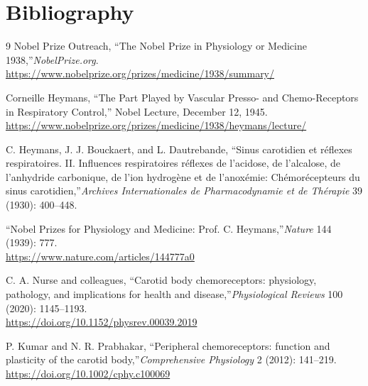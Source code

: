 \section{Bibliography}

\begin{thebibliography}{9}
Nobel Prize Outreach, ``The Nobel Prize in Physiology or Medicine 1938,''\emph{NobelPrize.org}.\\
\url{https://www.nobelprize.org/prizes/medicine/1938/summary/}

Corneille Heymans, ``The Part Played by Vascular Presso- and Chemo-Receptors in Respiratory Control,'' Nobel Lecture, December 12, 1945.\\
\url{https://www.nobelprize.org/prizes/medicine/1938/heymans/lecture/}

C. Heymans, J. J. Bouckaert, and L. Dautrebande, ``Sinus carotidien et réflexes respiratoires. II. Influences respiratoires réflexes de l'acidose, de l'alcalose, de l'anhydride carbonique, de l'ion hydrogène et de l'anoxémie: Chémorécepteurs du sinus carotidien,''\emph{Archives Internationales de Pharmacodynamie et de Thérapie} 39 (1930): 400--448.

``Nobel Prizes for Physiology and Medicine: Prof. C. Heymans,''\emph{Nature} 144 (1939): 777.\\
\url{https://www.nature.com/articles/144777a0}

C. A. Nurse and colleagues, ``Carotid body chemoreceptors: physiology, pathology, and implications for health and disease,''\emph{Physiological Reviews} 100 (2020): 1145--1193.\\
\url{https://doi.org/10.1152/physrev.00039.2019}

P. Kumar and N. R. Prabhakar, ``Peripheral chemoreceptors: function and plasticity of the carotid body,''\emph{Comprehensive Physiology} 2 (2012): 141--219.\\
\url{https://doi.org/10.1002/cphy.c100069}
\end{thebibliography}
